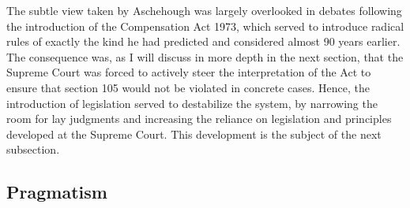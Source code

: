 The subtle view taken by Aschehough was largely overlooked in debates following the introduction of the Compensation Act 1973, which served to introduce radical rules of exactly the kind he had predicted and considered almost 90 years earlier. The consequence was, as I will discuss in more depth in the next section, that the Supreme Court was forced to actively steer the interpretation of the Act to ensure that section 105 would not be violated in concrete cases. Hence, the introduction of legislation served to destabilize the system, by narrowing the room for lay judgments and increasing the reliance on legislation and principles developed at the Supreme Court. This development is the subject of the next subsection.

%

\subsection{Pragmatism}\label{sec:prag}

